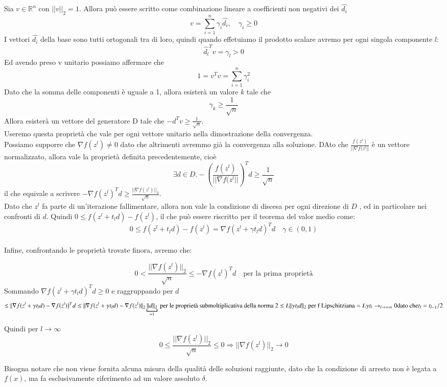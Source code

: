 \begin{thproof} Sia $v \in \mathbb{R}^{n}$ con $||v||_{2} = 1$.
Allora può essere scritto come combinazione lineare a coefficienti non
negativi dei $\hat{d_i}$
$$ v = \displaystyle \sum_{i=1}^{n} \gamma_i \hat{d_i}, 
\quad \gamma_i \geq 0 $$ I vettori $\hat{d_i}$ della base sono tutti
ortogonali tra di loro, quindi quando effetuiamo il prodotto scalare
avremo per ogni singola componente $l$:
$$ \hat{d_l}^{T} v = \gamma_l > 0 $$
Ed avendo preso v unitario possiamo affermare che
$$ 1 = v^{T} v   = \displaystyle \sum_{i=1}^{n} \gamma_{i}^2$$
Dato che la somma delle componenti \`e uguale a 1, allora esister\`a un
valore $k$ tale che
$$ {\gamma_k} \geq \frac{1}{\sqrt{n}}$$
Allora esister\`a un vettore del generatore D tale che $ -d^{T}v \geq
\frac{1}{\sqrt{n}} $. \\

Useremo questa propriet\`a che vale per ogni vettore unitario nella
dimostrazione della convergenza.\\ Possiamo supporre che $ \nabla
f(z^{l}) \neq 0$ dato che altrimenti avremmo gi\`a la convergenza alla
soluzione.  DAto che $\frac{f(z^{l})}{|| \nabla f(z^{l}||}$ \`e un
vettore normalizzato, allora vale la propriet\`a definita
precedentemente, cio\`e
$$\exists d \in D . - \left(\frac{f(z^{l})}{|| \nabla f(z^{l}||}\right)^{T} d \geq \frac{1}{\sqrt{n}}$$
il che equivale a scrivere $ -\nabla f(z^{l})^{T} d \geq \frac{||
\nabla f(z^{l})||_{2}}{\sqrt{n}} $.\\ Dato che $z^l$ fa parte di
un'iterazione fallimentare, allora non vale la condizione di discesa
per ogni direzione di $D$ , ed in particolare nei confronti di $d$.
Quindi $0 \leq f(z^l + t_l d) - f(z^l)$, il che può essere riscritto
per il teorema del valor medio come:
$$0 \leq f(z^{l} + t_l d) - f(z^{l}) =  \nabla f(z^{l} + \gamma t_l d)^{T} d \quad \gamma \in (0,1) $$
\\ Infine, confrontando le propriet\`a trovate finora, avremo che:

$$ 0 < 
\frac{|| \nabla f(z^{l})||_{2}}{\sqrt{n}} \leq -\nabla f(z^{l})^{T} d
\quad \text{per la prima propriet\`a}$$ Sommando $\nabla f(z^{l} +
\gamma t_l d )^T d \geq 0$ e raggruppando per $d$
$$\leq
 [ \nabla f(z^{l} + \gamma t_l d ) - \nabla f(z^{l})]^{T} d \leq ||
\nabla f(z^{l} + \gamma t_{l} d ) - \nabla f(z^{l}) ||_{2}
\underbracket{||d||_{2}}_{=1} \text{ per le propriet\`a
submoltiplicativa della norma 2} \\ \leq L || \gamma t_l d||_{2}
\text{ per f Lipschitziana} = L \gamma t_l \rightarrow_{l \to +
\infty} 0 \text{dato che} t_l=t_{l-1}/2$$

Quindi per $l \rightarrow \infty$
$$
0 \leq \frac{|| \nabla f(z^{l})||_{2}}{\sqrt{n}} \leq 0
\Longrightarrow || \nabla f(z^{l})||_{2} \rightarrow 0
$$
\end{thproof} Bisogna notare che non viene fornita alcuna misura della
qualit\`a delle soluzioni raggiunte, dato che la condizione di arresto
non \`e legata a $f(x)$, ma fa esclusivamente riferimento ad un valore
assoluto $\delta$.  
\outbpdocument


